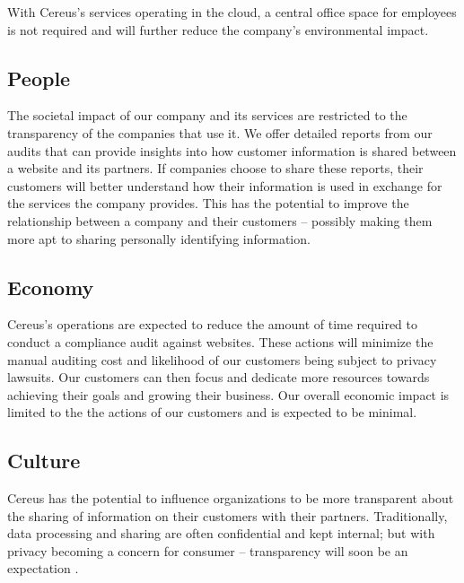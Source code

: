 With Cereus's services operating in the cloud, a central office space for employees is not required and will further reduce the company's environmental impact.

\subsection{People}

The societal impact of our company and its services are restricted to the transparency of the companies that use it. We offer detailed reports from our audits that can provide insights into how customer information is shared between a website and its partners. If companies choose to share these reports, their customers will better understand how their information is used in exchange for the services the company provides. This has the potential to improve the relationship between a company and their customers -- possibly making them more apt to sharing personally identifying information.

\subsection{Economy}

Cereus's operations are expected to reduce the amount of time required to conduct a compliance audit against websites. These actions will minimize the manual auditing cost and likelihood of our customers being subject to privacy lawsuits. Our customers can then focus and dedicate more resources towards achieving their goals and growing their business. Our overall economic impact is limited to the the actions of our customers and is expected to be minimal.

\subsection{Culture}

Cereus has the potential to influence organizations to be more transparent about the sharing of information on their customers with their partners. Traditionally, data processing and sharing are often confidential and kept internal; but with privacy becoming a concern for consumer -- transparency will soon be an expectation \cite{meehan.forbes.2019}.


